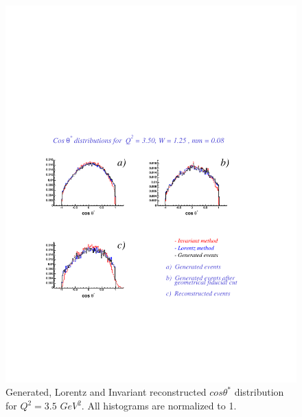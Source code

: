 \begin{figure}[h]
    \begin{center}
        \includegraphics[width = 12cm, bb = 60 140 540 540]{appendix/img/ctheta_q23.50_W1.25_mm0.08}
        \caption{Generated, Lorentz and Invariant reconstructed $cos\theta^*$ distribution for $Q^2=3.5$ $GeV^2$.
        All histograms are normalized to 1.}
    \end{center}
\end{figure}
